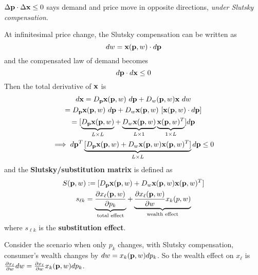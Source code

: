 \documentclass{article}
\begin{document}
 			\begin{corollary}
 				$\Delta \textbf{p} \cdot \Delta \textbf{x} \leq 0$ says demand and price move in opposite directions, \emph{under Slutsky compensation}.
 			\end{corollary}
 			
 			\begin{definition}
 				At infinitesimal price change, the Slutsky compensation can be written as 
 				\begin{equation}
 					dw = \textbf{x}(\textbf{p}, w) \cdot d\textbf{p}
 				\end{equation}
 				and the compensated law of demand becomes
 				\begin{equation}
 					d\textbf{p} \cdot d\textbf{x} \leq 0
 				\end{equation}
 				Then the total derivative of $\textbf{x}$ is 
 				\begin{gather}
 					d\textbf{x} = D_{\textbf{p}}\textbf{x}(\textbf{p}, w)\ d\textbf{p} + D_w(\textbf{p}, w) \textbf{x}\ dw \\
 					= D_{\textbf{p}}\textbf{x}(\textbf{p}, w)\ d\textbf{p} + D_w \textbf{x} (\textbf{p}, w)\ [\textbf{x}(\textbf{p}, w) \cdot d\textbf{p}] \\
 					= [\underbrace{D_{\textbf{p}}\textbf{x}(\textbf{p}, w)}_{L \times L} + \underbrace{D_w \textbf{x} (\textbf{p}, w)}_{L \times 1} \underbrace{\textbf{x}(\textbf{p}, w)^T}_{1 \times L}] d\textbf{p} \\
 					\implies d\textbf{p}^T 
 					\underbrace{[D_{\textbf{p}}\textbf{x}(\textbf{p}, w) + D_w \textbf{x} (\textbf{p}, w) \textbf{x}(\textbf{p}, w)^T]}_{L \times L} d\textbf{p} \leq 0
 				\end{gather}
 				and the \textbf{Slutsky/substitution matrix} is defined as
 				\begin{gather}
 					S(\textbf{p}, w) := [D_{\textbf{p}}\textbf{x}(\textbf{p}, w) + D_w \textbf{x} (\textbf{p}, w) \textbf{x}(\textbf{p}, w)^T] \\
 					s_{\ell k} = \underbrace{\frac{\partial{x_\ell(\textbf{p}, w)}}{\partial{p_k}}}_{\text{{total effect}}} + \underbrace{\frac{\partial{x_\ell(\textbf{p}, w)}}{\partial{w}} x_k (p, w)}_{\text{{wealth effect}}}
 				\end{gather}
 				where $s_{\ell k}$ is the \textbf{substitution effect}.
 			\end{definition}
 			
 			\begin{remark}
 				Consider the scenario when only $p_k$ changes, with Slutsky compensation, consumer's wealth changes by $dw = x_k(\textbf{p}, w) dp_k$. So the wealth effect on $x_\ell$ is $\frac{\partial{x_\ell}}{\partial{w}} dw = \frac{\partial{x_\ell}}{\partial{w}} x_k(\textbf{p}, w) dp_k$.
 			\end{remark}
 			
\end{document}
